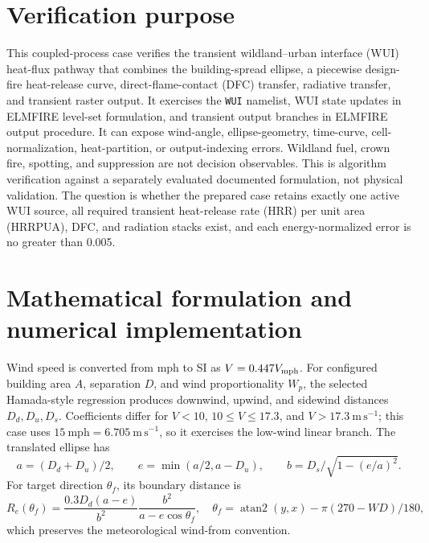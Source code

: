 \section{Verification purpose}

This coupled-process case verifies the transient wildland--urban interface (WUI) heat-flux pathway that combines the building-spread ellipse, a piecewise design-fire heat-release curve, direct-flame-contact (DFC) transfer, radiative transfer, and transient raster output. It exercises the \texttt{WUI} namelist, WUI state updates in ELMFIRE level-set formulation, and transient output branches in ELMFIRE output procedure. It can expose wind-angle, ellipse-geometry, time-curve, cell-normalization, heat-partition, or output-indexing errors. Wildland fuel, crown fire, spotting, and suppression are not decision observables. This is algorithm verification against a separately evaluated documented formulation, not physical validation. The question is whether the prepared case retains exactly one active WUI source, all required transient heat-release rate (HRR) per unit area (HRRPUA), DFC, and radiation stacks exist, and each energy-normalized error is no greater than 0.005.

\section{Mathematical formulation and numerical implementation}

Wind speed is converted from mph to SI as \(V=0.447V_{\rm mph}\). For configured building area \(A\), separation \(D\), and wind proportionality \(W_p\), the selected Hamada-style regression produces downwind, upwind, and sidewind distances \(D_d,D_u,D_s\). Coefficients differ for \(V<10\), \(10\le V\le17.3\), and \(V>17.3~\mathrm{m\,s^{-1}}\); this case uses \(15~\mathrm{mph}=6.705~\mathrm{m\,s^{-1}}\), so it exercises the low-wind linear branch. The translated ellipse has
\[
 a=(D_d+D_u)/2,\qquad e=\min(a/2,a-D_u),\qquad
 b=D_s/\sqrt{1-(e/a)^2}.
\]
For target direction \(\theta_f\), its boundary distance is
\[
 R_e(\theta_f)=
 \frac{0.3D_d(a-e)}{b^2}\frac{b^2}{a-e\cos\theta_f},
 \quad
 \theta_f=\operatorname{atan2}(y,x)-\pi(270-WD)/180,
\]
which preserves the meteorological wind-from convention.

